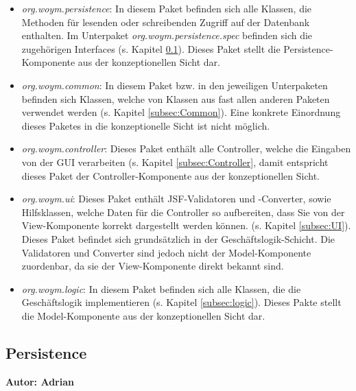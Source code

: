 \documentclass[fontsize=12pt,paper=a4,twoside]{scrartcl}
\begin{document}
\begin{itemize}
\item \textit{org.woym.persistence}: In diesem Paket befinden sich alle Klassen, die Methoden für lesenden oder schreibenden Zugriff auf der Datenbank enthalten. Im Unterpaket \textit{org.woym.persistence.spec} befinden sich die zugehörigen Interfaces (s. Kapitel \ref{subsec:persistence}). Dieses Paket stellt die Persistence-Komponente aus der konzeptionellen Sicht dar.
\item \textit{org.woym.common}: In diesem Paket  bzw. in den jeweiligen Unterpaketen befinden sich Klassen, welche von Klassen aus fast allen anderen Paketen verwendet werden (s. Kapitel \ref{subsec:Common}). Eine konkrete Einordnung dieses Paketes in die konzeptionelle Sicht ist nicht möglich. 
\item \textit{org.woym.controller}: Dieses Paket enthält alle Controller, welche die Eingaben von der GUI verarbeiten (s. Kapitel \ref{subsec:Controller}, damit entspricht dieses Paket der Controller-Komponente aus der konzeptionellen Sicht.
\item \textit{org.woym.ui}: Dieses Paket enthält JSF-Validatoren und -Converter, sowie Hilfsklassen, welche Daten für die Controller so aufbereiten, dass Sie von der View-Komponente korrekt dargestellt werden können. (s. Kapitel \ref{subsec:UI}). Dieses Paket befindet sich grundsätzlich in der Geschäftslogik-Schicht. Die Validatoren und Converter sind jedoch nicht der Model-Komponente zuordenbar, da sie der View-Komponente direkt bekannt sind. 
\item \textit{org.woym.logic}: In diesem Paket befinden sich alle Klassen, die die Geschäftslogik implementieren (s. Kapitel \ref{subsec:logic}). Dieses Pakte stellt die Model-Komponente aus der konzeptionellen Sicht dar.
\end{itemize}

\subsection{Persistence}
\label{subsec:persistence}
\textbf{Autor: Adrian}\\
\end{document}
